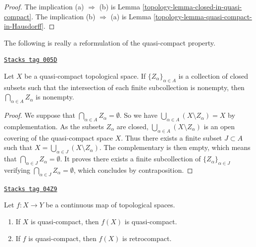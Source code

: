 \begin{proof}

The implication (a) $\Rightarrow$ (b) is
Lemma \ref{topology-lemma-closed-in-quasi-compact}.
The implication (b) $\Rightarrow$ (a) is
Lemma \ref{topology-lemma-quasi-compact-in-Hausdorff}.
\end{proof}

The following is really a reformulation of the
quasi-compact property.

\begin{lemma}
\label{topology-lemma-intersection-closed-in-quasi-compact}
\href{https://stacks.math.columbia.edu/tag/005D}{\texttt{Stacks tag 005D}}

Let $X$ be a quasi-compact topological space.
If $\{Z_\alpha\}_{\alpha \in A}$ is a collection of closed subsets
such that the intersection of each finite subcollection
is nonempty, then $\bigcap_{\alpha \in A} Z_\alpha$ is nonempty.
\end{lemma}

\begin{proof}
We suppose that $\bigcap_{\alpha \in A} Z_{\alpha} = \emptyset$.
So we have $\bigcup_{\alpha \in A} (X\setminus Z_{\alpha})=X$ by
complementation. As the subsets $Z_\alpha$ are closed,
$\bigcup_{\alpha \in A} (X \setminus Z_{\alpha})$
is an open covering of the quasi-compact space $X$.
Thus there exists a finite subset $J \subset A$ such that
$X = \bigcup_{\alpha \in J} (X\setminus Z_{\alpha})$.
The complementary is then empty, which means that
$\bigcap_{\alpha \in J} Z_{\alpha} = \emptyset$. It proves there exists a
finite subcollection of $\{Z_{\alpha}\}_{\alpha \in J}$ verifying
$\bigcap_{\alpha \in J} Z_{\alpha}=\emptyset$, which concludes by
contraposition.
\end{proof}

\begin{lemma}
\label{topology-lemma-image-quasi-compact}
\href{https://stacks.math.columbia.edu/tag/04Z9}{\texttt{Stacks tag 04Z9}}

Let $f : X \to Y$ be a continuous map of topological spaces.
\begin{enumerate}
\item If $X$ is quasi-compact, then $f(X)$ is quasi-compact.
\item If $f$ is quasi-compact, then $f(X)$ is retrocompact.
\end{enumerate}
\end{lemma}

